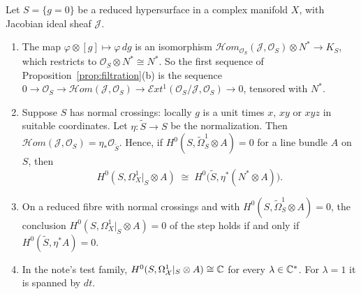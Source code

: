 \begin{proposition}\label{prop:kernel}
Let $S=\{g=0\}$ be a reduced hypersurface in a complex manifold $X$, with Jacobian ideal sheaf $\mathcal J$.
\begin{enumerate}[label=\textup{(\alph*)}]
\item The map $\varphi\otimes[g]\mapsto\varphi\,dg$ is an isomorphism $\mathcal{H}om_{\mathcal O_S}(\mathcal J,\mathcal O_S)\otimes N^*\to K_S$, which restricts to $\mathcal O_S\otimes N^*\cong N^*$. So the first sequence of Proposition~\ref{prop:filtration}(b) is the sequence $0\to\mathcal O_S\to\mathcal{H}om(\mathcal J,\mathcal O_S)\to\mathcal{E}xt^1(\mathcal O_S/\mathcal J,\mathcal O_S)\to0$, tensored with $N^*$.
\item Suppose $S$ has normal crossings: locally $g$ is a unit times $x$, $xy$ or $xyz$ in suitable coordinates. Let $\eta:\tilde S\to S$ be the normalization. Then $\mathcal{H}om(\mathcal J,\mathcal O_S)=\eta_*\mathcal O_{\tilde S}$. Hence, if $H^0(S,\widetilde\Omega^1_S\otimes A)=0$ for a line bundle $A$ on $S$, then
\[
H^0(S,\Omega^1_X|_S\otimes A)\;\cong\;H^0\bigl(\tilde S,\eta^*(N^*\otimes A)\bigr).
\]
\item On a reduced fibre with normal crossings and with $H^0(S,\widetilde\Omega^1_S\otimes A)=0$, the conclusion $H^0(S,\Omega^1_X|_S\otimes A)=0$ of the step holds if and only if $H^0(\tilde S,\eta^*A)=0$.
\item In the note's test family, $H^0(S,\Omega^1_{\mathcal X}|_S\otimes A)\cong\mathbb{C}$ for every $\lambda\in\mathbb{C}^*$. For $\lambda=1$ it is spanned by $dt$.
\end{enumerate}
\end{proposition}

